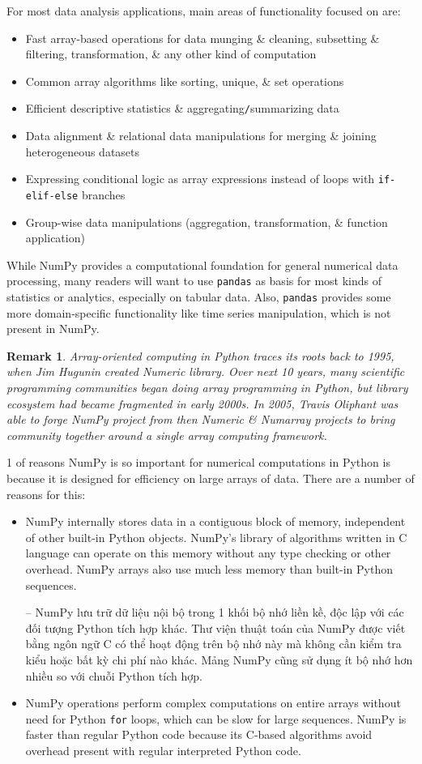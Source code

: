 \documentclass{article}
\newtheorem{remark}{Remark}
\begin{document}
\begin{itemize}
	For most data analysis applications, main areas of functionality focused on are:
	\begin{itemize}
		\item Fast array-based operations for data munging \& cleaning, subsetting \& filtering, transformation, \& any other kind of computation
		\item Common array algorithms like sorting, unique, \& set operations
		\item Efficient descriptive statistics \& aggregating{\tt/}summarizing data
		\item Data alignment \& relational data manipulations for merging \& joining heterogeneous datasets
		\item Expressing conditional logic as array expressions instead of loops with {\tt if-elif-else} branches
		\item Group-wise data manipulations (aggregation, transformation, \& function application)
	\end{itemize}
	While NumPy provides a computational foundation for general numerical data processing, many readers will want to use {\tt pandas} as basis for most kinds of statistics or analytics, especially on tabular data. Also, {\tt pandas} provides some more domain-specific functionality like time series manipulation, which is not present in NumPy.
	\begin{remark}
		Array-oriented computing in Python traces its roots back to 1995, when {\sc Jim Hugunin} created Numeric library. Over next 10 years, many scientific programming communities began doing array programming in Python, but library ecosystem had became fragmented in early 2000s. In 2005, {\sc Travis Oliphant} was able to forge NumPy project from then Numeric \& Numarray projects to bring community together around a single array computing framework.
	\end{remark}
	1 of reasons NumPy is so important for numerical computations in Python is because it is designed for efficiency on large arrays of data. There are a number of reasons for this:
	\begin{itemize}
		\item NumPy internally stores data in a contiguous block of memory, independent of other built-in Python objects. NumPy's library of algorithms written in C language can operate on this memory without any type checking or other overhead. NumPy arrays also use much less memory than built-in Python sequences.
		
		-- NumPy lưu trữ dữ liệu nội bộ trong 1 khối bộ nhớ liền kề, độc lập với các đối tượng Python tích hợp khác. Thư viện thuật toán của NumPy được viết bằng ngôn ngữ C có thể hoạt động trên bộ nhớ này mà không cần kiểm tra kiểu hoặc bất kỳ chi phí nào khác. Mảng NumPy cũng sử dụng ít bộ nhớ hơn nhiều so với chuỗi Python tích hợp.
		\item NumPy operations perform complex computations on entire arrays without need for Python {\tt for} loops, which can be slow for large sequences. NumPy is faster than regular Python code because its C-based algorithms avoid overhead present with regular interpreted Python code.
		

\end{itemize}
\end{itemize}
\end{document}
